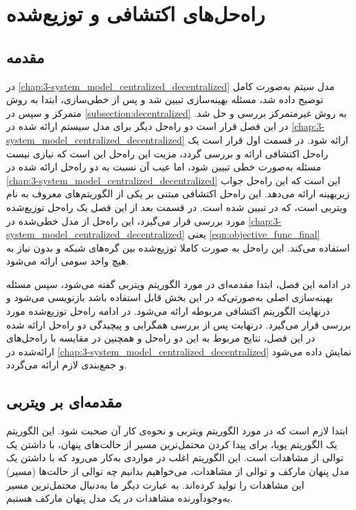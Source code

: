 \chapter{راه‌حل‌های اکتشافی و توزیع‌شده}\label{chap:4-heuristic_distributed}
\thispagestyle{empty}
\section{مقدمه}\label{subsection:inroduction_4}
	در \cref{chap:3-system_model_centralized_decentralized} مدل سیتم به‌صورت کامل توضیح داده شد، مسئله بهینه‌سازی تبیین شد و پس از خطی‌سازی، ابتدا به روش متمرکز و سپس در \cref{subsection:decentralized} به روش غیرمتمرکز بررسی و حل شد. 
	در این فصل قرار است دو راه‌حل دیگر برای مدل سیستم ارائه شده در \cref{chap:3-system_model_centralized_decentralized} ارائه شود. 
	 در قسمت اول قرار است یک راه‌حل اکتشافی ارائه و بررسی گردد، مزیت این راه‌حل این است که نیازی نیست مسئله به‌صورت خطی تبیین شود، اما عیب آن نسبت به دو راه‌حل ارائه شده در \cref{chap:3-system_model_centralized_decentralized} این است که این راه‌حل جواب زیربهینه ارائه می‌دهد. 
	 این راه‌حل اکتشافی مبتنی بر یکی از الگوریتم‌های معروف به نام ویتربی است، که در \cite{viterbi} تبیین شده است. 
	 در قسمت بعد از این فصل یک راه‌حل توزیع‌شده مورد بررسی قرار می‌گیرد، این راه‌حل از مدل خطی‌شده در \cref{chap:3-system_model_centralized_decentralized} یعنی \cref{eqn:objective_func_final} استفاده می‌کند. این راه‌حل به صورت کاملا توزیع‌شده بین گره‌های شبکه و بدون نیاز به هیچ واحد سومی ارائه می‌شود.  
	 
	 در ادامه این فصل، ابتدا مقدمه‌ای در مورد الگوریتم ویتربی گفته می‌شود، سپس مسئله‌ بهینه‌سازی اصلی به‌صورتی‌که در این بخش قابل استفاده باشد بازنویسی می‌شود و درنهایت الگوریتم اکتشافی مربوطه ارائه می‌شود. در ادامه راه‌حل توزیع‌شده مورد بررسی قرار می‌گیرد.
	درنهایت پس از بررسی همگرایی و پیچیدگی دو راه‌حل ارائه شده در این فصل، نتایج مربوط به این دو راه‌حل و همچنین در مقایسه با راه‌حل‌های ارائه‌شده در \cref{chap:3-system_model_centralized_decentralized} نمایش داده می‌شود و جمع‌بندی لازم ارائه می‌گردد. 
\section{مقدمه‌ای بر ویتربی}
	 ابتدا لازم است که در مورد الگوریتم ویتربی و نحوه‌ی کار آن صحبت شود. این الگوریتم یک الگوریتم پویا، برای پیدا کردن محتمل‌ترین مسیر از حالت‌های پنهان، با داشتن یک توالی از مشاهدات است. این الگوریتم اغلب در مواردی به‌کار می‌رود که با داشتن یک مدل پنهان مارکف و توالی‌ از مشاهدات، می‌خواهیم بدانیم چه توالی‌ از حالت‌ها (مسیر) این مشاهدات را تولید کرده‌اند. به عبارت دیگر ما به‌دنبال محتمل‌ترین مسیر به‌وجودآورنده مشاهدات در یک مدل پنهان مارکف هستیم. 
	 
